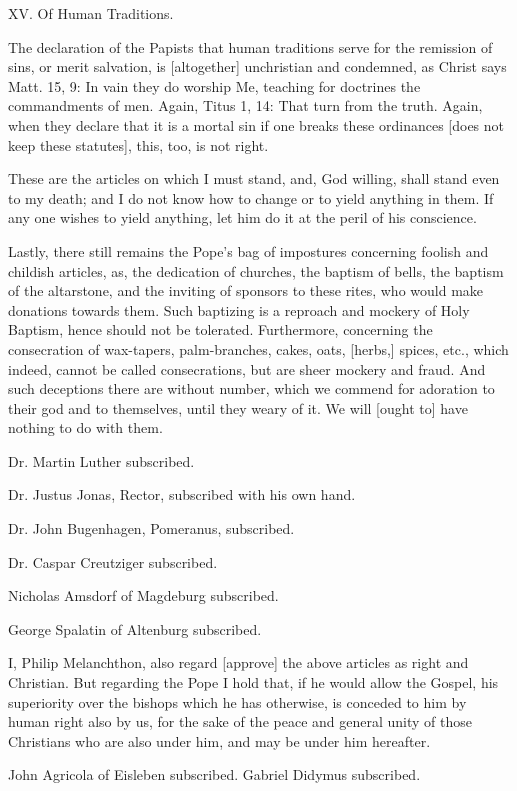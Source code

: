 XV. Of Human Traditions.

The declaration of the Papists that human traditions serve for
the remission of sins, or merit salvation, is [altogether]
unchristian and condemned, as Christ says Matt. 15, 9: In vain
they do worship Me, teaching for doctrines the commandments of
men. Again, Titus 1, 14: That turn from the truth. Again, when
they declare that it is a mortal sin if one breaks these
ordinances [does not keep these statutes], this, too, is not
right.

These are the articles on which I must stand, and, God
willing, shall stand even to my death; and I do not know how
to change or to yield anything in them. If any one wishes to
yield anything, let him do it at the peril of his conscience.

Lastly, there still remains the Pope's bag of impostures
concerning foolish and childish articles, as, the dedication
of churches, the baptism of bells, the baptism of the
altarstone, and the inviting of sponsors to these rites, who
would make donations towards them. Such baptizing is a
reproach and mockery of Holy Baptism, hence should not be
tolerated. Furthermore, concerning the consecration of
wax-tapers, palm-branches, cakes, oats, [herbs,] spices, etc.,
which indeed, cannot be called consecrations, but are sheer
mockery and fraud. And such deceptions there are without
number, which we commend for adoration to their god and to
themselves, until they weary of it. We will [ought to] have
nothing to do with them.


     Dr. Martin Luther subscribed.

     Dr. Justus Jonas, Rector, subscribed with his own hand.

     Dr. John Bugenhagen, Pomeranus, subscribed.

     Dr. Caspar Creutziger subscribed.

     Nicholas Amsdorf of Magdeburg subscribed.

     George Spalatin of Altenburg subscribed.

     I, Philip Melanchthon, also regard [approve] the above
     articles as right and Christian. But regarding the Pope I hold
     that, if he would allow the Gospel, his superiority over the
     bishops which he has otherwise, is conceded to him by human
     right also by us, for the sake of the peace and general unity
     of those Christians who are also under him, and may be under
     him hereafter.

     John Agricola of Eisleben subscribed.
     Gabriel Didymus subscribed.

